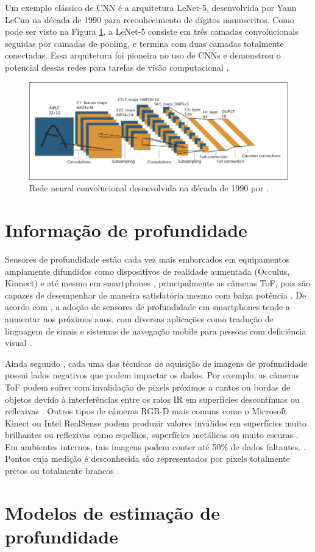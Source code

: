 Um exemplo clássico de CNN é a arquitetura LeNet-5, desenvolvida por Yann LeCun na década de 1990 para reconhecimento de dígitos manuscritos. Como pode ser visto na Figura \ref{fig:lenet5}, a LeNet-5 consiste em três camadas convolucionais seguidas por camadas de pooling, e termina com duas camadas totalmente conectadas. Essa arquitetura foi pioneira no uso de CNNs e demonstrou o potencial dessas redes para tarefas de visão computacional \cite{lecun1998gradient}.

\begin{figure}
    \centering   
    \includegraphics[width=\textwidth]{fig/A-Convolutional-Neural-Net-LeNet-5-From-Lecun-et-al-1998-C1998-IEEE-reprinted.png}
    \caption{Rede neural convolucional desenvolvida na década de 1990 por .}
    \label{fig:lenet5}
\end{figure}


\section{Informação de profundidade}
Sensores de profundidade estão cada vez mais embarcados em equipamentos amplamente difundidos como dispositivos de realidade aumentada (Occulus, Kinnect) e até mesmo em smartphones \cite{du2020depthlab}, principalmente as câmeras ToF, pois são capazes de desempenhar de maneira satisfatória mesmo com baixa potência \cite{branscombe2018microsoft}. De acordo com \cite{xie2021ultradepth}, a adoção de sensores de profundidade em smartphones tende a aumentar nos próximos anos, com diversas aplicações como tradução de linguagem de sinais \cite{park2021enabling} e sistemas de navegação mobile para pessoas com deficiência visual \cite{see2022smartphone}.


Ainda segundo \cite{castellano2023performance}, cada uma das técnicas de aquisição de imagens de profundidade possui lados negativos que podem impactar os dados. Por exemplo, as câmeras ToF podem sofrer com invalidação de pixels próximos a cantos ou bordas de objetos devido à interferências entre os raios IR em superfícies descontínuas ou reflexivas \cite{hansard2012time}. Outros tipos de câmeras RGB-D mais comuns como o Microsoft Kinect ou Intel RealSense podem produzir valores inválidos em superfícies muito brilhantes ou reflexivas como espelhos, superfícies metálicas ou muito escuras \cite{zollhofer2019commodity}. Em ambientes internos, tais imagens podem conter até 50\% de dados faltantes. \cite{zhang2022indepth} \cite{zhang2018deep}. Pontos cuja medição é desconhecida são representados por pixels totalmente pretos ou totalmente brancos \cite{dourado2020multi}.

\section{Modelos de estimação de profundidade}
